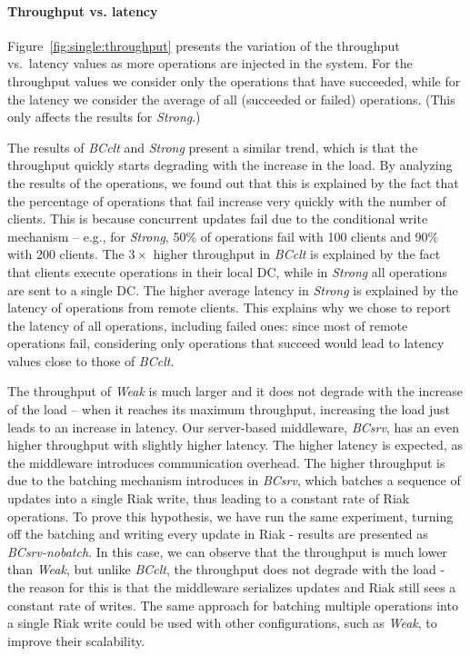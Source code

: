 \documentclass[conference]{IEEEtran}
\begin{document}
\paragraph{Throughput vs. latency}
Figure~\ref{fig:single:throughput} presents the variation of the throughput vs.\ latency values as
more operations are injected in the system.
For the throughput values we consider only the operations that have succeeded, while for
the latency we consider the average of all (succeeded or failed) operations. (This only affects the results for \emph{Strong}.)

The results of \emph{BCclt} and \emph{Strong} present a similar trend, which
is that the
throughput quickly starts degrading with the increase in the load.
By analyzing the results of the operations, we found out that this is explained
by the fact that the percentage of operations that fail increase very quickly with
the number of clients. This is because concurrent updates fail due to the conditional write 
mechanism -- e.g., for \emph{Strong}, 50\% of operations 
fail with 100 clients and 90\% with 200 clients.
The $3\times$ higher throughput in \emph{BCclt} is explained by the fact that 
clients execute operations in their local DC, while in \emph{Strong} all operations
are sent to a single DC. 
The higher average latency in \emph{Strong} is explained by the latency of
operations from remote clients. 
This explains why we chose to report the latency 
of all operations, including failed ones: since most of remote operations fail, considering
only operations that succeed would lead to latency values close to those of
\emph{BCclt}.

The throughput of \emph{Weak} is much larger and it does not degrade with
the increase of the load -- when it reaches its maximum throughput, increasing
the load just leads to an increase in latency. 
Our server-based middleware, \emph{BCsrv}, has an even higher throughput with slightly
higher latency. 
The higher latency is expected, as the middleware introduces communication overhead.
The higher throughput is due to the batching mechanism introduces in \emph{BCsrv},
which batches a sequence of updates into a single Riak write,
thus leading to a constant rate of Riak operations.
To prove this hypothesis, we have run the same experiment, turning off the batching and writing
every update in Riak - results
are presented as \emph{BCsrv-nobatch}.
In this case, we can observe that the throughput is much lower than \emph{Weak}, but unlike
\emph{BCclt}, the throughput does not degrade with the load - the reason for this is that
the middleware serializes updates and Riak still sees a constant rate of writes. 
The same approach for batching multiple operations into a single Riak write could
be used with other configurations, such as \emph{Weak},
to improve their scalability.
\end{document}
